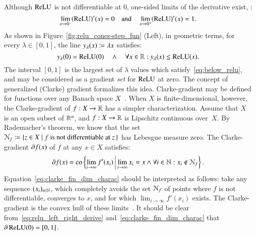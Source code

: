 \documentclass[11pt,times]{article}
\begin{document}
Although $\operatorname{\mathrm{ReLU}}$ is not differentiable at $0$, one-sided limits of the
derivative exist, {\ie}:
%
\begin{equation}
  \label{eq:relu_left_right_derive}
\lim_{x \to 0^-} (\operatorname{\mathrm{ReLU}})'(x) = 0 \quad \text{and} \quad \lim_{x \to 0^+} (\operatorname{\mathrm{ReLU}})'(x) = 1.   
\end{equation}
%
As shown in Figure~\ref{fig:relu_cones-step_fun} (Left), in geometric terms, for every
$\lambda \in [0,1]$, the line $y_\lambda(x) \coloneqq \lambda x$
satisfies:
%
\begin{equation}
  \label{eq:below_relu}
  y_\lambda (0) = \operatorname{\mathrm{ReLU}} (0) \quad \wedge \quad \forall x \in \mathbb{R}: y_\lambda(x) \leq
  \operatorname{\mathrm{ReLU}} (x).
\end{equation}
%
The interval $[0,1]$ is the largest set of $\lambda$ values which
satisfy~\eqref{eq:below_relu}, and may be considered as a gradient
\emph{set} for $\operatorname{\mathrm{ReLU}}$ at zero. The concept of generalized (Clarke)
gradient formalizes this idea. Clarke-gradient may be defined for
functions over any Banach space $X$~\parencite[page
27]{Clarke:Opt_Non_Smooth_Analysis-Book:1990}. When $X$ is
finite-dimensional, however, the Clarke-gradient of $f: X \to \mathbb{R}$ has
a simpler characterization. Assume that $X$ is an open subset of
$\mathbb{R}^n$, and $f: X \to \mathbb{R}$ is Lipschitz continuous over~$X$. By
Rademacher's theorem, we know that the set
${\cal N}_f \coloneqq \{{z \in X} \mid {f \text{ is not
    differentiable at } z \, }\}$ has Lebesgue measure zero. The
Clarke-gradient $\partial f(x)$ of $f$ at any $x \in X$ satisfies:
%
\begin{equation}
  \label{eq:clarke_fin_dim_charac}
  \clarke{f}(x) = \convHull \setbarTall{\lim_{i \to \infty} f'(x_i)}{ \lim_{i \to \infty} x_i = x \wedge \forall
    i\in \N: x_i \notin {\cal N}_f}.
\end{equation}
%
Equation~\eqref{eq:clarke_fin_dim_charac} should be interpreted as
follows: take any sequence $(x_i)_{i \in \mathbb{N}}$, which completely avoids
the set ${\cal N}_f$ of points where $f$ is not differentiable,
converges to $x$, and for which $\lim_{i \to \infty} f'(x_i)$
exists. The Clarke-gradient is the convex hull of these
limits~\parencite[page 63]{Clarke:Opt_Non_Smooth_Analysis-Book:1990}. It
should be clear from~\eqref{eq:relu_left_right_derive}
and~\eqref{eq:clarke_fin_dim_charac}
that $\partial \operatorname{\mathrm{ReLU}}(0) = [0,1]$.
\end{document}
